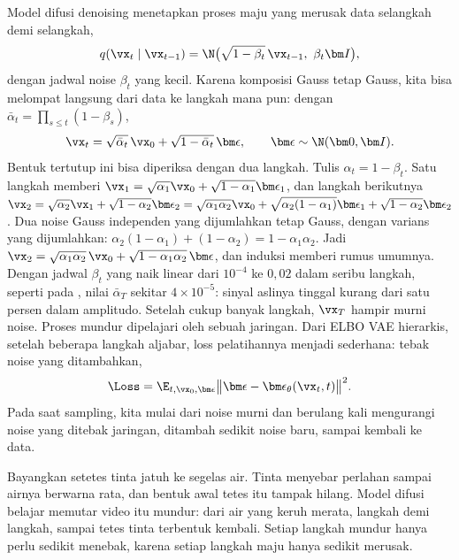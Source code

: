 Model difusi denoising \citep{sohldickstein2015,ho2020} menetapkan proses maju yang merusak data
selangkah demi selangkah,
\begin{equation}
q(\vx_t\mid\vx_{t-1})=\N\big(\sqrt{1-\beta_t}\,\vx_{t-1},\ \beta_t\bm I\big),
\end{equation}
dengan jadwal noise $\beta_t$ yang kecil. Karena komposisi Gauss tetap Gauss, kita bisa melompat
langsung dari data ke langkah mana pun: dengan $\bar\alpha_t=\prod_{s\le t}(1-\beta_s)$,
\begin{equation}
\vx_t=\sqrt{\bar\alpha_t}\,\vx_0+\sqrt{1-\bar\alpha_t}\,\bm\epsilon,\qquad \bm\epsilon\sim\N(\bm0,\bm I).
\end{equation}
Bentuk tertutup ini bisa diperiksa dengan dua langkah. Tulis $\alpha_t=1-\beta_t$. Satu langkah memberi
$\vx_1=\sqrt{\alpha_1}\vx_0+\sqrt{1-\alpha_1}\bm\epsilon_1$, dan langkah berikutnya
$\vx_2=\sqrt{\alpha_2}\vx_1+\sqrt{1-\alpha_2}\bm\epsilon_2=\sqrt{\alpha_1\alpha_2}\vx_0+\sqrt{\alpha_2(1-\alpha_1)}\bm\epsilon_1+\sqrt{1-\alpha_2}\bm\epsilon_2$.
Dua noise Gauss independen yang dijumlahkan tetap Gauss, dengan varians yang dijumlahkan:
$\alpha_2(1-\alpha_1)+(1-\alpha_2)=1-\alpha_1\alpha_2$. Jadi
$\vx_2=\sqrt{\alpha_1\alpha_2}\,\vx_0+\sqrt{1-\alpha_1\alpha_2}\,\bm\epsilon$, dan induksi memberi rumus umumnya.
Dengan jadwal $\beta_t$ yang naik linear dari $10^{-4}$ ke $0{,}02$ dalam seribu langkah, seperti pada
\citet{ho2020}, nilai $\bar\alpha_T$ sekitar $4\times10^{-5}$: sinyal aslinya tinggal kurang dari satu
persen dalam amplitudo. Setelah cukup banyak langkah, $\vx_T$ hampir murni noise. Proses mundur dipelajari oleh sebuah
jaringan. Dari ELBO VAE hierarkis, setelah beberapa langkah aljabar, loss pelatihannya menjadi
sederhana: tebak noise yang ditambahkan,
\begin{equation}
\Loss=\E_{t,\vx_0,\bm\epsilon}\big\|\bm\epsilon-\bm\epsilon_\theta(\vx_t,t)\big\|^2.
\end{equation}
Pada saat sampling, kita mulai dari noise murni dan berulang kali mengurangi noise yang ditebak
jaringan, ditambah sedikit noise baru, sampai kembali ke data.

Bayangkan setetes tinta jatuh ke segelas air. Tinta menyebar perlahan sampai airnya berwarna rata,
dan bentuk awal tetes itu tampak hilang. Model difusi belajar memutar video itu mundur: dari air
yang keruh merata, langkah demi langkah, sampai tetes tinta terbentuk kembali. Setiap langkah mundur
hanya perlu sedikit menebak, karena setiap langkah maju hanya sedikit merusak.

